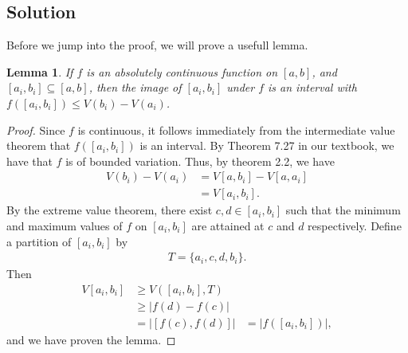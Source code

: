 \documentclass[10pt,a4paper]{article}
\theoremstyle{theorem}
\newtheorem{lemma}{Lemma}
\theoremstyle{definition}
\begin{document}
\subsection*{Solution}
Before we jump into the proof, we will prove a usefull lemma.
\begin{lemma}
If $f$ is an absolutely continuous function on $[a, b]$, and $[a_i, b_i] \subseteq [a, b]$, then the image of $[a_i, b_i]$ under $f$ is an interval with $f([a_i, b_i]) \leq V(b_i) - V(a_i)$.
\end{lemma}

\begin{proof}
Since $f$ is continuous, it follows immediately from the intermediate value theorem that $f([a_i, b_i])$ is an interval. By Theorem 7.27 in our textbook, we have that $f$ is of bounded variation. Thus, by theorem 2.2, we have
\begin{align*}
V(b_i) - V(a_i) &= V[a, b_i] - V[a, a_i]\\
&= V[a_i, b_i].
\end{align*}
By the extreme value theorem, there exist $c, d \in [a_i, b_i]$ such that the minimum and maximum values of $f$ on $[a_i, b_i]$ are attained at $c$ and $d$ respectively. Define a partition of $[a_i, b_i]$ by
\begin{align*}
T = \{a_i, c, d, b_i\}.
\end{align*}
Then
\begin{align*}
V[a_i, b_i] &\geq V([a_i, b_i], T)\\
&\geq |f(d) - f(c)|\\
&= |[f(c), f(d)]|
&= |f([a_i, b_i])|,
\end{align*}
and we have proven the lemma.
\end{proof}
\end{document}

